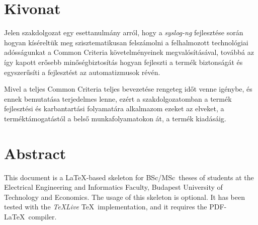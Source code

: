\chapter*{Kivonat}

Jelen szakdolgozat egy esettanulmány arról, hogy a \emph{syslog-ng} fejlesztése során hogyan
kíséreltük meg szisztematikusan felszámolni a felhalmozott technológiai adósságunkat a Common
Criteria követelményeinek megvalósításával, továbbá az így kapott erősebb minőségbiztosítás hogyan
fejleszti a termék biztonságát és egyszerűsíti a fejlesztést az automatizmusok révén.

Mivel a teljes Common Criteria teljes bevezetése rengeteg időt venne igénybe, és ennek bemutatása
terjedelmes lenne, ezért a szakdolgozatomban a termék fejlesztési és karbantartási folyamatára
alkalmazom ezeket az elveket, a terméktámogatástól a belső munkafolyamatokon át, a termék
kiadásáig.

\vfill

\chapter*{Abstract}

This document is a \LaTeX-based skeleton for BSc/MSc~theses of students at the Electrical
Engineering and Informatics Faculty, Budapest University of Technology and Economics. The usage of
this skeleton is optional. It has been tested with the \emph{TeXLive} \TeX~implementation, and it
requires the PDF-\LaTeX~compiler.
\vfill

